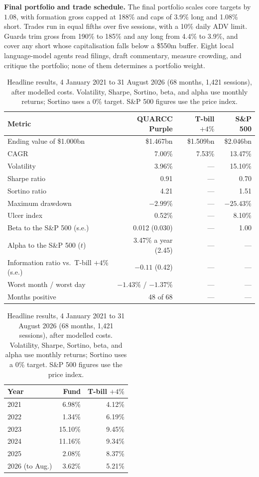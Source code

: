 \documentclass[10pt,twocolumn,letterpaper]{article}
\begin{document}
\textbf{Final portfolio and trade schedule.} The final portfolio scales core targets by $1.08$, with formation gross capped at 188\% and caps of 3.9\% long and 1.08\% short. Trades run in equal fifths over five sessions, with a 10\% daily ADV limit. Guards trim gross from 190\% to 185\% and any long from 4.4\% to 3.9\%, and cover any short whose capitalisation falls below a \$550m buffer. Eight local language-model agents read filings, draft commentary, measure crowding, and critique the portfolio; none of them determines a portfolio weight.

\begin{table}[t]
\centering
\caption{Headline results, 4 January 2021 to 31 August 2026 (68 months, 1,421 sessions), after modelled costs. Volatility, Sharpe, Sortino, beta, and alpha use monthly returns; Sortino uses a 0\% target. S\&P 500 figures use the price index.}
\label{tab:results}
\footnotesize
\setlength{\tabcolsep}{5pt}
\begin{tabular}{lrrr}
\toprule
Metric & QUARCC Purple & T-bill $+4\%$ & S\&P 500 \\
\midrule
Ending value of \$1.000bn & \$1.467bn & \$1.509bn & \$2.046bn \\
CAGR & 7.00\% & 7.53\% & 13.47\% \\
Volatility & 3.96\% & --- & 15.10\% \\
Sharpe ratio & 0.91 & --- & 0.70 \\
Sortino ratio & 4.21 & --- & 1.51 \\
Maximum drawdown & $-2.99\%$ & --- & $-25.43\%$ \\
Ulcer index & 0.52\% & --- & 8.10\% \\
Beta to the S\&P 500 (s.e.) & 0.012 (0.030) & --- & 1.00 \\
Alpha to the S\&P 500 ($t$) & 3.47\% a year (2.45) & --- & --- \\
Information ratio vs.\ T-bill $+4\%$ (s.e.) & $-0.11$ (0.42) & --- & --- \\
Worst month / worst day & $-1.43\%$ / $-1.37\%$ & --- & --- \\
Months positive & 48 of 68 & --- & --- \\
\bottomrule
\end{tabular}
\qquad
\begin{tabular}{lrr}
\toprule
Year & Fund & T-bill $+4\%$ \\
\midrule
2021 & 6.98\% & 4.12\% \\
2022 & 1.34\% & 6.19\% \\
2023 & 15.10\% & 9.45\% \\
2024 & 11.16\% & 9.34\% \\
2025 & 2.08\% & 8.37\% \\
2026 (to Aug.) & 3.62\% & 5.21\% \\
\bottomrule
\end{tabular}
\end{table}
\end{document}
